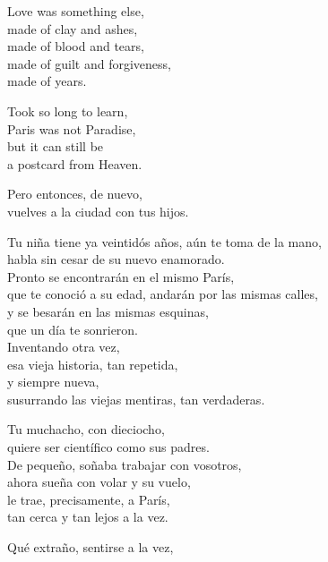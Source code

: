 \documentclass[12pt,twoside]{article}
\begin{document}
\begin{poem}
\begin{stanza}
Love was something else,\\
made of clay and ashes,\\
made of blood and tears,\\
made of guilt and forgiveness,\\
made of years.
\end{stanza}
\begin{stanza}
Took so long to learn,\\
Paris was not Paradise,\\
but it can still be\\
a postcard from Heaven.
\end{stanza}
\end{poem}

\begin{poem}
\begin{stanza}
Pero entonces, de nuevo,\\
vuelves a la ciudad con tus hijos.
\end{stanza}
\begin{stanza}
Tu niña tiene ya veintidós años, aún te toma de la mano,\\
habla sin cesar de su nuevo enamorado.\\
Pronto se encontrarán en el mismo París,\\
que te conoció a su edad, andarán por las mismas calles,\\
y se besarán en las mismas esquinas,\\
que un día te sonrieron.\\
Inventando otra vez,\\
esa vieja historia, tan repetida,\\
y siempre nueva,\\
susurrando las viejas mentiras, tan verdaderas.
\end{stanza}
\begin{stanza}
Tu muchacho, con dieciocho,\\
quiere ser científico como sus padres.\\
De pequeño, soñaba trabajar con vosotros,\\
ahora sueña con volar y su vuelo,\\
le trae, precisamente, a París,\\
tan cerca y tan lejos a la vez.
\end{stanza}
\begin{stanza}
Qué extraño, sentirse a la vez,\\

\end{stanza}
\end{poem}
\end{document}
